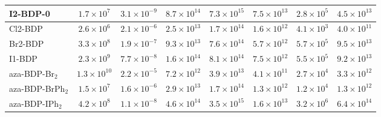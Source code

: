\begin{table}
\begin{tabular}{lccccccc}
    I2-BDP-0 & $1.7\times10^{7}$ & $3.1\times10^{-9}$ & $8.7\times10^{14}$ & $7.3\times10^{15}$ & $7.5\times10^{13}$ & $2.8\times10^{5}$ & $4.5\times10^{13}$ \\
    \midrule
    Cl2-BDP & $2.6\times10^{6}$ & $2.1\times10^{-6}$ & $2.5\times10^{13}$ & $1.7\times10^{14}$ & $1.6\times10^{12}$ & $4.1\times10^{3}$ & $4.0\times10^{11}$ \\
    Br2-BDP & $3.3\times10^{8}$ & $1.9\times10^{-7}$ & $9.3\times10^{13}$ & $7.6\times10^{14}$ & $5.7\times10^{12}$ & $5.7\times10^{5}$ & $9.5\times10^{13}$ \\
    I1-BDP & $2.3\times10^{9}$ & $7.7\times10^{-8}$ & $1.6\times10^{14}$ & $8.1\times10^{14}$ & $7.5\times10^{12}$ & $5.5\times10^{5}$ & $9.2\times10^{13}$ \\
    aza-BDP-Br$_2$ & $1.3\times10^{10}$ & $2.2\times10^{-5}$ & $7.2\times10^{12}$ & $3.9\times10^{13}$ & $4.1\times10^{11}$ & $2.7\times10^{4}$ & $3.3\times10^{12}$ \\
    aza-BDP-BrPh$_2$ & $1.5\times10^{7}$ & $1.6\times10^{-6}$ & $2.9\times10^{13}$ & $1.7\times10^{14}$ & $1.3\times10^{12}$ & $1.2\times10^{4}$ & $1.3\times10^{12}$ \\
    aza-BDP-IPh$_2$ & $4.2\times10^{8}$ & $1.1\times10^{-8}$ & $4.6\times10^{14}$ & $3.5\times10^{15}$ & $1.6\times10^{13}$ & $3.2\times10^{6}$ & $6.4\times10^{14}$ \\
    \bottomrule
  \end{tabular}
\end{table}

\clearpage  %
\clearpage  %
\clearpage  %
\clearpage  %
